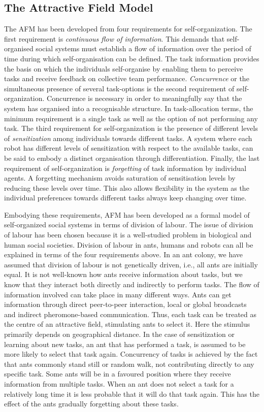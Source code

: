 \documentclass[smallcondensed]{svjour3}
\begin{document}
\subsection{The Attractive Field Model}
\label{afm:framework}
The AFM has been developed from four requirements for self-organization.  The first requirement is \textit{continuous flow of information}.  This demands that self-organised social systems must establish a flow of information over the period of time during which self-organisation can be defined.  The task information provides the basis on which the individuals self-organise by enabling them to perceive tasks and receive feedback on collective team performance.  \textit{Concurrence} or the simultaneous presence of several task-options is the second requirement of self-organization. Concurrence is necessary in order to meaningfully say that the system has organised into a recognisable structure.  In task-allocation terms, the minimum requirement is a single task as well as the option of not performing any task.  The third requirement for self-organization is the presence of different levels of \textit{sensitization} among individuals towards different tasks.  A system where each robot has different levels of sensitization with respect to the available tasks, can be said to embody a distinct organisation through differentiation.  Finally, the last requirement of self-organization is {\em forgetting} of task information by individual agents. A forgetting mechanism avoids saturation of sensitisation levels by reducing these levels over time. This also allows flexibility in the system as the individual preferences towards different tasks always keep changing over time. 

Embodying these requirements, AFM has been developed as a formal model of self-organized social systems in terms of division of labour.  The issue of division of labour has been chosen because it is a well-studied problem in biological and human social societies.  Division of labour in ants, humans and robots can all be explained in terms of the four requirements above.  In an ant colony, we have assumed that division of labour is not genetically driven, i.e., all ants are initially equal.  It is not well-known how ants receive information about tasks, but we know that they interact both directly and indirectly to perform tasks.  The flow of information involved can take place in many different ways.  Ants can get information through direct peer-to-peer interaction, local or global broadcasts and indirect pheromone-based communication. Thus, each task can be treated as the centre of an attractive field, stimulating ants to select it.  Here the stimulus primarily depends on geographical distance.  In the case of sensitization or learning about new tasks, an ant that has performed a task, is assumed to be more likely to select that task again. Concurrency of tasks is achieved by the fact that ants commonly stand still or random walk, not contributing directly to any specific task.  Some ants will be in a favoured position where they receive information from multiple tasks.  When an ant does not select a task for a relatively long time it is less probable that it will do that task again.  This has the effect of the ants gradually forgetting about these tasks.
\end{document}
